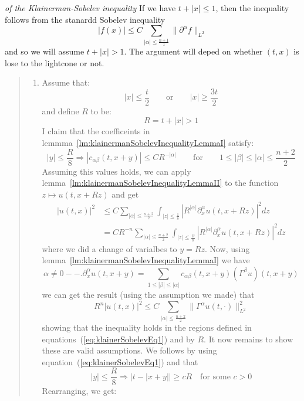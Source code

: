 \documentclass{book}
\newenvironment{Proof}[1][]
  {\begin{ProofTcb}[#1]}
  {\end{ProofTcb}}
\renewcommand{\bf}[1]{\textbf{#1}}
\newcommand{\Rw}{\Rightarrow}
\begin{document}
\begin{Proof}\label{proofOfKlainerman}
	\emph{of the Klainerman-Sobelev inequality} If we have $t + |x| \le 1$, then the inequality follows from the
	stanardd Sobelev inequality
	\[
		|f(x)| \le C \sum_{|\alpha| \le \frac{n+1}{1}} \|  \partial^\alpha f\|_{L^2}
	\]
	and so we will assume $t + |x| > 1$. The argument will deped on whether $(t,x)$ is lose to the lightcone or
	not.
	\begin{quote}
		\begin{enumerate}
			\item[(\bf{Case 1})] Assume that:
				\begin{equation}\label{eq:klainerSobelevEq1}
				  |x| \le \frac{t}{2} \qquad \text{or} \qquad  |x| \ge \frac{3t}{2}
				\end{equation}
				and define $R$ to be:
				\[
					R = t + |x| > 1
				\]
				I claim that the coefficeints in
				lemmma~\ref{lm:klainermanSobelevInequalityLemmaI} satisfy:
				\[
					|y| \le \frac{R}{8} \Rw |c_{\alpha\beta}(t, x+y)| \le CR^{-|\alpha|} \qquad
					\text{for} \qquad  1 \le |\beta| \le |\alpha| \le \frac{n+2}{2}
				\]
				Assuming this values holds, we can apply
				lemma~\ref{lm:klainermanSobelevInequalityLemmaII} to the function $z \mapsto u(t,
				x + Rz)$ and get
				\begin{align*}
					|u(t,x)|^2 &\le C \sum_{|\alpha| \le \frac{n+2}{2}} \int_{|z| \le \frac{1}{8}}
					\left| R^{|\alpha|}  \partial_x^\alpha u(t, x +Rz)\right|^2 dz\\
							   &= CR^{-n} \sum_{|\alpha| \le \frac{n+2}{2}} \int_{|z| \le
							   \frac{R}{8}}
					\left| R^{|\alpha|}  \partial_x^\alpha u(t, x +Rz)\right|^2 dz
				\end{align*}
				where we did a change of varialbes to $y  =Rz$. Now, using
				lemma~\ref{lm:klainermanSobelevInequalityLemmaI} we have
				\[
					\alpha \ne 0 --.  \partial_x^\alpha u(t,x+y) = \sum_{1 \le |\beta| \le
					|\alpha|} c_{\alpha\beta}(t, x+y)(\Gamma^\beta u)(t,x+y)
				\]
				we can get the result (using the assumption we made) that
				\[
					R^n |u(t,x)|^2 \le C \sum_{|\alpha| \le \frac{n+2}{2}} \|\Gamma^\alpha
					u(t,\cdot)\|_{L^2}^2
				\]
				showing that the inequality holds in the regions defined in
				equations~(\ref{eq:klainerSobelevEq1}) and by $R$. It now remains to show these are
				valid assumptions. We follows by using equation~(\ref{eq:klainerSobelevEq1}) and
				that
				\[
					|y| \le \frac{R}{8} \Rw \left|t-|x+y|\right| \ge cR \quad\text{for some $c
					> 0$}
				\]
				Rearranging, we get:

\end{enumerate}
\end{quote}
\end{Proof}
\end{document}
